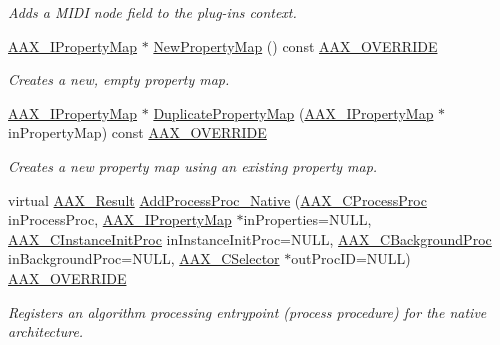 \begin{DoxyCompactItemize}
\begin{DoxyCompactList}\small\item\em Adds a M\+I\+DI node field to the plug-\/in\textquotesingle{}s context. \end{DoxyCompactList}\item 
\mbox{\hyperlink{a01869}{A\+A\+X\+\_\+\+I\+Property\+Map}} $\ast$ \mbox{\hyperlink{a01901_ac4f19b39b69e84868adca243006a7fec}{New\+Property\+Map}} () const \mbox{\hyperlink{a00392_ac2f24a5172689ae684344abdcce55463}{A\+A\+X\+\_\+\+O\+V\+E\+R\+R\+I\+DE}}
\begin{DoxyCompactList}\small\item\em Creates a new, empty property map. \end{DoxyCompactList}\item 
\mbox{\hyperlink{a01869}{A\+A\+X\+\_\+\+I\+Property\+Map}} $\ast$ \mbox{\hyperlink{a01901_ae6b016afd2eda4c467471695804937be}{Duplicate\+Property\+Map}} (\mbox{\hyperlink{a01869}{A\+A\+X\+\_\+\+I\+Property\+Map}} $\ast$in\+Property\+Map) const \mbox{\hyperlink{a00392_ac2f24a5172689ae684344abdcce55463}{A\+A\+X\+\_\+\+O\+V\+E\+R\+R\+I\+DE}}
\begin{DoxyCompactList}\small\item\em Creates a new property map using an existing property map. \end{DoxyCompactList}\item 
virtual \mbox{\hyperlink{a00392_a4d8f69a697df7f70c3a8e9b8ee130d2f}{A\+A\+X\+\_\+\+Result}} \mbox{\hyperlink{a01901_a21e758a4ad757e694c183548fe58f0f0}{Add\+Process\+Proc\+\_\+\+Native}} (\mbox{\hyperlink{a00401_ad6dd5e1aa5bd2f8462966685e3b26a6e}{A\+A\+X\+\_\+\+C\+Process\+Proc}} in\+Process\+Proc, \mbox{\hyperlink{a01869}{A\+A\+X\+\_\+\+I\+Property\+Map}} $\ast$in\+Properties=N\+U\+LL, \mbox{\hyperlink{a00401_a3963a850079d3186e08c97a1a4d0ef1c}{A\+A\+X\+\_\+\+C\+Instance\+Init\+Proc}} in\+Instance\+Init\+Proc=N\+U\+LL, \mbox{\hyperlink{a00401_aa64561d963284a3124a0821e7dc79c9a}{A\+A\+X\+\_\+\+C\+Background\+Proc}} in\+Background\+Proc=N\+U\+LL, \mbox{\hyperlink{a00392_aeaf9b387f902c50a8360ff423f4a1f23}{A\+A\+X\+\_\+\+C\+Selector}} $\ast$out\+Proc\+ID=N\+U\+LL) \mbox{\hyperlink{a00392_ac2f24a5172689ae684344abdcce55463}{A\+A\+X\+\_\+\+O\+V\+E\+R\+R\+I\+DE}}
\begin{DoxyCompactList}\small\item\em Registers an algorithm processing entrypoint (process procedure) for the native architecture. \end{DoxyCompactList}\item 

\end{DoxyCompactItemize}
